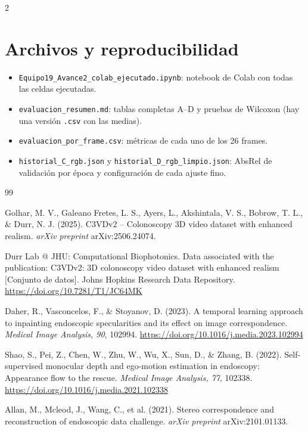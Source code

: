 \documentclass[11pt,letterpaper]{article}
\begin{document}
\begin{multicols}{2}
\section{Archivos y reproducibilidad}

\begin{itemize}
\item \texttt{Equipo19\_\allowbreak Avance2\_\allowbreak colab\_\allowbreak ejecutado.ipynb}: notebook de Colab con todas las celdas ejecutadas.
\item \texttt{evaluacion\_\allowbreak resumen.md}: tablas completas A--D y pruebas de Wilcoxon (hay una versión \texttt{.csv} con las medias).
\item \texttt{evaluacion\_\allowbreak por\_\allowbreak frame.csv}: métricas de cada uno de los 26 frames.
\item \texttt{historial\_\allowbreak C\_\allowbreak rgb.json} y \texttt{historial\_\allowbreak D\_\allowbreak rgb\_\allowbreak limpio.json}: AbsRel de validación por época y configuración de cada ajuste fino.
\end{itemize}



\renewcommand{\refname}{Bibliografía}
\begin{thebibliography}{99}

Golhar, M. V., Galeano Fretes, L. S., Ayers, L., Akshintala, V. S., Bobrow, T. L., \& Durr, N. J. (2025). C3VDv2 -- Colonoscopy 3D video dataset with enhanced realism. \textit{arXiv preprint} arXiv:2506.24074.

Durr Lab @ JHU: Computational Biophotonics. Data associated with the publication: C3VDv2: 3D colonoscopy video dataset with enhanced realism [Conjunto de datos]. Johns Hopkins Research Data Repository. \url{https://doi.org/10.7281/T1/JC64MK}

Daher, R., Vasconcelos, F., \& Stoyanov, D. (2023). A temporal learning approach to inpainting endoscopic specularities and its effect on image correspondence. \textit{Medical Image Analysis, 90}, 102994. \url{https://doi.org/10.1016/j.media.2023.102994}

Shao, S., Pei, Z., Chen, W., Zhu, W., Wu, X., Sun, D., \& Zhang, B. (2022). Self-supervised monocular depth and ego-motion estimation in endoscopy: Appearance flow to the rescue. \textit{Medical Image Analysis, 77}, 102338. \url{https://doi.org/10.1016/j.media.2021.102338}

Allan, M., Mcleod, J., Wang, C., et al. (2021). Stereo correspondence and reconstruction of endoscopic data challenge. \textit{arXiv preprint} arXiv:2101.01133.


\end{thebibliography}

\end{multicols}
\end{document}
